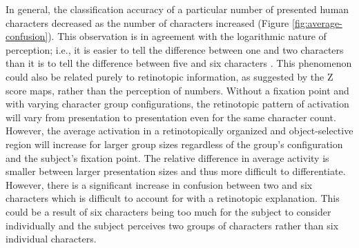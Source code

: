 \documentclass[5p,authoryear]{elsarticle}
\begin{document}

In general, the classification accuracy of a particular number of presented human characters decreased as the number of characters increased (Figure \ref{fig:average-confusion}).
This observation is in agreement with the logarithmic nature of perception; i.e., it is easier to tell the difference between one and two characters than it is to tell the difference between five and six characters \citep{Shepard1975,Dehaene2003}.
This phenomenon could also be related purely to retinotopic information, as suggested by the Z score maps, rather than the perception of numbers.
Without a fixation point and with varying character group configurations, the retinotopic pattern of activation will vary from presentation to presentation even for the same character count.
However, the average activation in a retinotopically organized and object-selective region will increase for larger group sizes regardless of the group's configuration and the subject's fixation point.
The relative difference in average activity is smaller between larger presentation sizes and thus more difficult to differentiate.
However, there is a significant increase in confusion between two and six characters which is difficult to account for with a retinotopic explanation.
This could be a result of six characters being too much for the subject to consider individually and the subject perceives two groups of characters rather than six individual characters.
\end{document}
